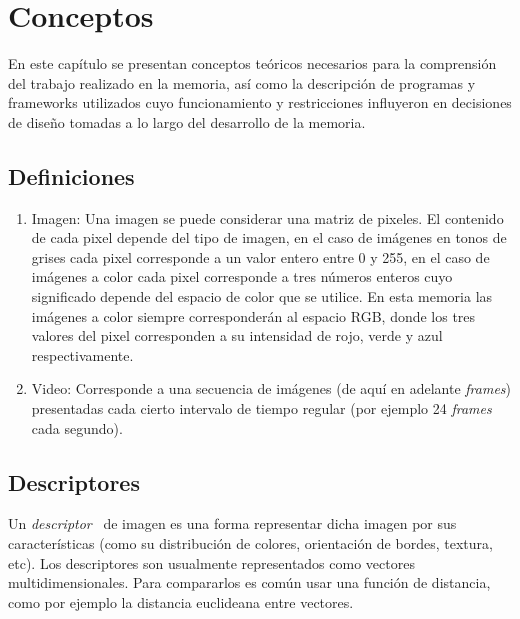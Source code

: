 \chapter{Conceptos}\label{conceptos}

En este capítulo se presentan conceptos teóricos necesarios para la comprensión del trabajo realizado en la memoria, así como la descripción de  programas y frameworks utilizados cuyo funcionamiento y restricciones influyeron en decisiones de diseño tomadas a lo largo del desarrollo de la memoria.

\section{Definiciones}\label{definiciones}
\begin{enumerate}
\item Imagen: Una imagen se puede considerar una matriz de pixeles. El contenido de cada pixel depende del tipo de imagen, en el caso de imágenes en tonos de grises cada pixel corresponde a un valor entero entre 0 y 255, en el caso de imágenes a color cada pixel corresponde a tres números enteros cuyo significado depende del espacio de color que se utilice. En esta memoria las imágenes a color siempre corresponderán al espacio RGB, donde los tres valores del pixel corresponden a su intensidad de rojo, verde y azul respectivamente.

\item Video: Corresponde a una secuencia de imágenes (de aquí en adelante \textit{frames}) presentadas cada cierto intervalo de tiempo regular (por ejemplo 24 \textit{frames} cada segundo). 
\end{enumerate}

\section{Descriptores}\label{descriptores}
Un \emph{descriptor}~\cite{descriptors} de imagen es una forma representar dicha imagen por sus características (como su distribución de colores, orientación de bordes, textura, etc). Los descriptores son usualmente representados como vectores multidimensionales. Para compararlos es común usar una función de distancia, como por ejemplo la distancia euclideana entre vectores.

